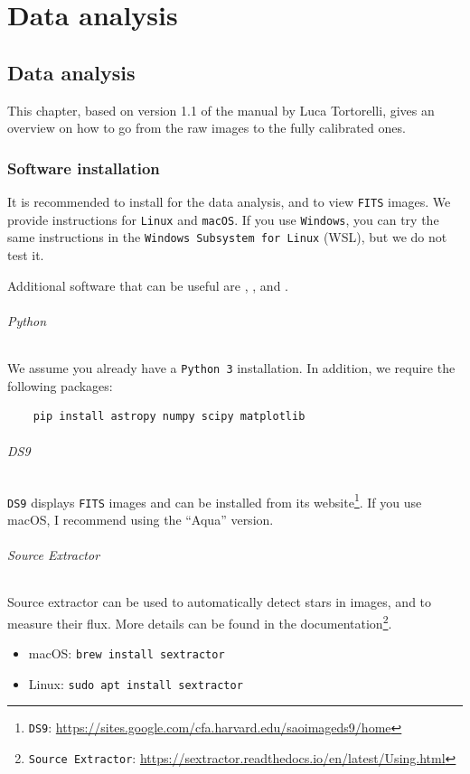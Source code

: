\documentclass[a4paper, 11pt, fleqn]{memoir}
\begin{document}
\part{Data analysis}

\chapter{Data analysis}

This chapter, based on version 1.1 of the manual by Luca Tortorelli\autocite{Tortorelli2015_DataReduction}, gives an overview on how to go from the raw images to the fully calibrated ones.

\section{Software installation}
It is recommended to install  for the data analysis, and  to view \texttt{FITS} images.
We provide instructions for \texttt{Linux} and \texttt{macOS}.
If you use \texttt{Windows}, you can try the same instructions in the \texttt{Windows Subsystem for Linux} (WSL), but we do not test it.


Additional software that can be useful are , , and .

\paragraph*{Python}
We assume you already have a \texttt{Python 3} installation. In addition, we require the following packages:
\begin{verbatim}
    pip install astropy numpy scipy matplotlib
\end{verbatim}


\paragraph*{DS9}

\texttt{DS9} displays \texttt{FITS} images and can be installed from its website\footnote{\texttt{DS9}: \url{https://sites.google.com/cfa.harvard.edu/saoimageds9/home}}.
If you use macOS, I recommend using the \enquote{Aqua} version.

\paragraph*{Source Extractor}
Source extractor can be used to automatically detect stars in images, and to measure their flux.
More details can be found in the documentation\footnote{\texttt{Source Extractor}: \url{https://sextractor.readthedocs.io/en/latest/Using.html}}.
\begin{itemize}
    \item macOS: \texttt{brew install sextractor}
    \item Linux: \texttt{sudo apt install sextractor}
\end{itemize}
\end{document}

